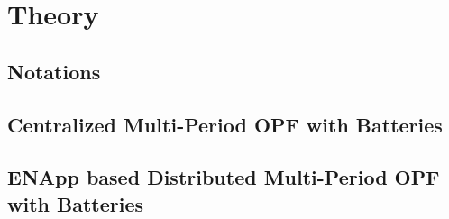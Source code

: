 \documentclass{article}
\begin{document}
\section{Theory}

\subsection{Notations}

\subsection{Centralized Multi-Period OPF with Batteries}

\subsection{ENApp based Distributed Multi-Period OPF with Batteries}
\end{document}
